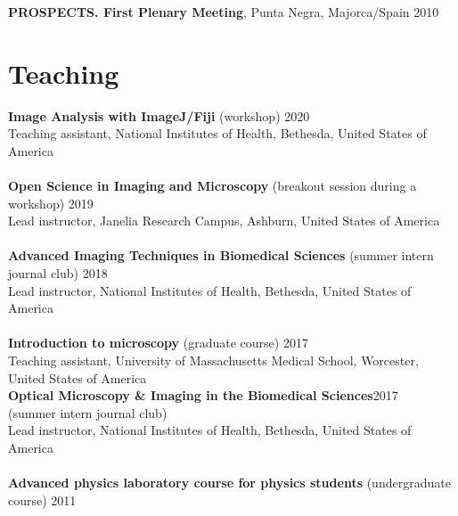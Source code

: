 \documentclass[margin,line]{res}
\begin{document}
\begin{resume}
\vspace*{-2.5mm}
{\bf PROSPECTS. First Plenary Meeting}, Punta Negra, Majorca/Spain  \hfill 2010 %


\section{\sc Teaching}

{\bf  Image Analysis with ImageJ/Fiji} (workshop)  \hfill 2020\\
Teaching assistant, National Institutes of Health, Bethesda, United States of America\\
\vspace*{-3mm}\\
{\bf  Open Science in Imaging and Microscopy} (breakout session during a workshop)  \hfill 2019\\
Lead instructor, Janelia Research Campus, Ashburn, United States of America\\
\vspace*{-3mm}\\
{\bf Advanced Imaging Techniques in Biomedical Sciences} (summer intern journal club) \hfill {2018}\\
Lead instructor, National Institutes of Health, Bethesda, United States of America \\
\vspace*{-3mm}\\
{\bf Introduction to microscopy} (graduate course) \hfill {2017}\\
Teaching assistant, University of Massachusetts Medical School, Worcester, \\
United States of America\\
{\bf Optical Microscopy \& Imaging in the Biomedical Sciences}\hfill {2017}\\
 (summer intern journal club) \\
 Lead instructor, National Institutes of Health, Bethesda, United States of America \\
\vspace*{-3mm}\\
{\bf Advanced physics laboratory course for physics students} (undergraduate course) \hfill {2011}\\

\end{resume}
\end{document}
